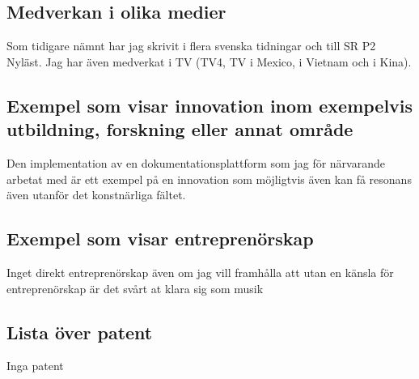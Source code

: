 \subsection*{\textsf{Medverkan i olika medier}}

Som tidigare nämnt har jag skrivit i flera svenska tidningar och till SR P2 Nyläst. Jag har även medverkat i TV (TV4, TV i Mexico, i Vietnam och i Kina).

\subsection*{\textsf{Exempel som visar innovation inom exempelvis utbildning, forskning eller annat område}}

Den implementation av en dokumentationsplattform som jag för närvarande arbetat med är ett exempel på en innovation som möjligtvis även kan få resonans även utanför det konstnärliga fältet.

\subsection*{\textsf{Exempel som visar entreprenörskap}}

Inget direkt entreprenörskap även om jag vill framhålla att utan en känsla för entreprenörskap är det svårt at klara sig som musik

\subsection*{\textsf{Lista över patent}}

Inga patent


